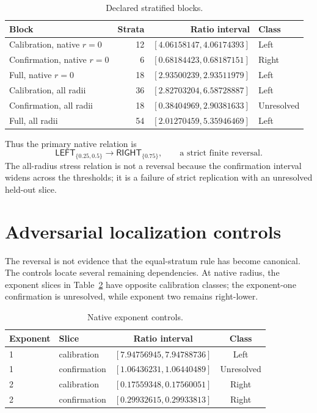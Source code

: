 \documentclass[10pt,a4paper]{article}
\begin{document}
\begin{table}[t]
\centering\small
\caption{Declared stratified blocks.}
\label{tab:primary}
\begin{tabular}{lrrl}
\toprule
Block & Strata & Ratio interval & Class\\
\midrule
Calibration, native $r=0$ & 12 & $[4.06158147,4.06174393]$ & Left\\
Confirmation, native $r=0$ & 6 & $[0.68184423,0.68187151]$ & Right\\
Full, native $r=0$ & 18 & $[2.93500239,2.93511979]$ & Left\\
Calibration, all radii & 36 & $[2.82703204,6.58728887]$ & Left\\
Confirmation, all radii & 18 & $[0.38404969,2.90381633]$ & Unresolved\\
Full, all radii & 54 & $[2.01270459,5.35946469]$ & Left\\
\bottomrule
\end{tabular}
\end{table}

Thus the primary native relation is
\[
 \mathsf{LEFT}_{\{0.25,0.5\}}
 \longrightarrow
 \mathsf{RIGHT}_{\{0.75\}},
 \qquad\text{a strict finite reversal.}
\]
The all-radius stress relation is not a reversal because the confirmation
interval widens across the thresholds; it is a failure of strict replication
with an unresolved held-out slice.

\section{Adversarial localization controls}

The reversal is not evidence that the equal-stratum rule has become canonical.
The controls locate several remaining dependencies.  At native radius, the
exponent slices in Table~\ref{tab:exponent} have opposite calibration classes;
the exponent-one confirmation is unresolved, while exponent two remains
right-lower.

\begin{table}[t]
\centering\small
\caption{Native exponent controls.}
\label{tab:exponent}
\begin{tabular}{llcc}
\toprule
Exponent & Slice & Ratio interval & Class\\
\midrule
1 & calibration & $[7.94756945,7.94788736]$ & Left\\
1 & confirmation & $[1.06436231,1.06440489]$ & Unresolved\\
2 & calibration & $[0.17559348,0.17560051]$ & Right\\
2 & confirmation & $[0.29932615,0.29933813]$ & Right\\
\bottomrule
\end{tabular}
\end{table}
\end{document}
